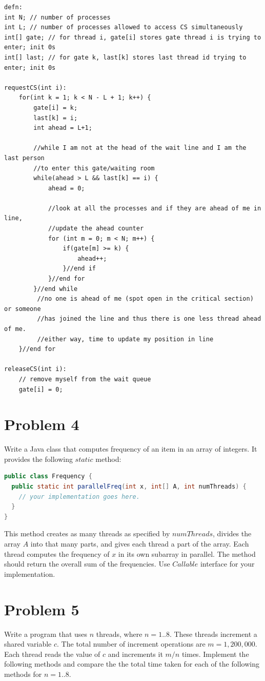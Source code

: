 \documentclass{article}
\begin{document}
\begin{lstlisting}
defn:
int N; // number of processes
int L; // number of processes allowed to access CS simultaneously
int[] gate; // for thread i, gate[i] stores gate thread i is trying to enter; init 0s
int[] last; // for gate k, last[k] stores last thread id trying to enter; init 0s

requestCS(int i):
	for(int k = 1; k < N - L + 1; k++) {
		gate[i] = k;
		last[k] = i;
		int ahead = L+1;

		//while I am not at the head of the wait line and I am the last person 
		//to enter this gate/waiting room
		while(ahead > L && last[k] == i) {
			ahead = 0;
				
			//look at all the processes and if they are ahead of me in line, 
			//update the ahead counter
			for (int m = 0; m < N; m++) {
				if(gate[m] >= k) {
					ahead++;
				}//end if
			}//end for
		}//end while
		 //no one is ahead of me (spot open in the critical section) or someone 
		 //has joined the line and thus there is one less thread ahead of me.
		 //either way, time to update my position in line
	}//end for
	
releaseCS(int i):
	// remove myself from the wait queue
	gate[i] = 0;

\end{lstlisting}

\pagebreak
\section{Problem 4}
Write a Java class that computes frequency of an item in an array of integers. It provides the following $static$ method:

\begin{lstlisting}[language=Java]
public class Frequency {
  public static int parallelFreq(int x, int[] A, int numThreads) {
    // your implementation goes here.
  }
}
\end{lstlisting}

This method creates as many threads as specified by $numThreads$, divides the array $A$ into that many parts, and gives each thread a part of the array. Each thread computes the frequency of $x$ in its own subarray in parallel. The method should return the overall sum of the frequencies. Use $Callable$ interface for your implementation.

\pagebreak
\section{Problem 5}
Write a program that uses $n$ threads, where $n = 1..8$. These threads increment a shared variable $c$. The total number of increment operations are $m = 1, 200, 000$. Each thread reads the value of $c$ and increments it $m/n$ times. Implement the following methods and compare the the total time taken for each of
the following methods for $n = 1..8$.
\end{document}
